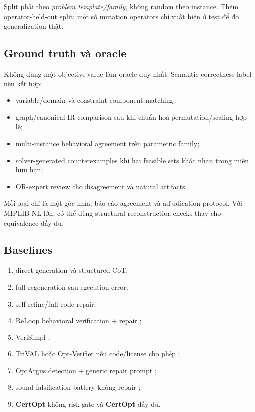 \documentclass[11pt,a4paper]{article}
\newcommand{\method}{\textsf{\textbf{CertOpt}}\xspace}
\begin{document}
Split phải theo \emph{problem template/family}, không random theo instance. Thêm operator-held-out split: một số mutation operators chỉ xuất hiện ở test để đo generalization thật.

\subsection{Ground truth và oracle}

Không dùng một objective value làm oracle duy nhất. Semantic correctness label nên kết hợp:

\begin{itemize}
  \item variable/domain và constraint component matching;
  \item graph/canonical-IR comparison sau khi chuẩn hoá permutation/scaling hợp lệ;
  \item multi-instance behavioral agreement trên parametric family;
  \item solver-generated counterexamples khi hai feasible sets khác nhau trong miền hữu hạn;
  \item OR-expert review cho disagreement và natural artifacts.
\end{itemize}

Mỗi loại chỉ là một góc nhìn; báo cáo agreement và adjudication protocol. Với MIPLIB-NL lớn, có thể dùng structural reconstruction checks thay cho equivalence đầy đủ.

\subsection{Baselines}

\begin{enumerate}
  \item direct generation và structured CoT;
  \item full regeneration sau execution error;
  \item self-refine/full-code repair;
  \item ReLoop behavioral verification + repair \parencite{lian2026reloop};
  \item VeriSimpl \parencite{rahman2026verisimpl};
  \item TriVAL hoặc Opt-Verifier nếu code/license cho phép \parencite{fang2026trival,liu2026optverifier};
  \item OptArgus detection + generic repair prompt \parencite{li2026optargus};
  \item sound falsification battery không repair \parencite{li2026falsification};
  \item \method không risk gate và \method đầy đủ.
\end{enumerate}
\end{document}
